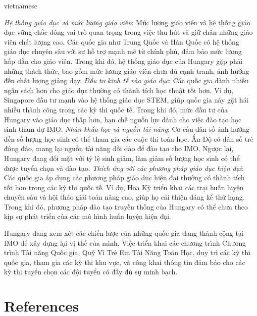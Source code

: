 \documentclass{article}
\begin{document}
\begin{otherlanguage*}{vietnamese}
\begin{itemize}[topsep=0pt, partopsep=0pt, itemsep=0pt]
    \ii \textit{Hệ thống giáo dục và mức lương giáo viên}: Mức lương giáo viên và hệ thống giáo dục vững chắc đóng vai trò quan trọng trong việc thu hút và giữ chân những giáo viên chất lượng cao.
    Các quốc gia như Trung Quốc và Hàn Quốc có hệ thống giáo dục chuyên sâu với sự hỗ trợ mạnh mẽ từ chính phủ, đảm bảo mức lương hấp dẫn cho giáo viên.
    Trong khi đó, hệ thống giáo dục của Hungary gặp phải những thách thức, bao gồm mức lương giáo viên chưa đủ cạnh tranh, ảnh hưởng đến chất lượng giảng dạy.
    \ii \textit{Đầu tư kinh tế vào giáo dục}: Các quốc gia dành nhiều ngân sách hơn cho giáo dục thường có thành tích học thuật tốt hơn.
    Ví dụ, Singapore đầu tư mạnh vào hệ thống giáo dục STEM, giúp quốc gia này gặt hái nhiều thành công trong các kỳ thi quốc tế.
    Trong khi đó, mức đầu tư của Hungary vào giáo dục thấp hơn, hạn chế nguồn lực dành cho việc đào tạo học sinh tham dự IMO.
    \ii \textit{Nhân khẩu học và nguồn tài năng}: Cơ cấu dân số ảnh hưởng đến số lượng học sinh có thể tham gia các cuộc thi toán học. Ấn Độ có dân số trẻ đông đảo, mang lại nguồn tài năng dồi dào để đào tạo cho IMO.
    Ngược lại, Hungary đang đối mặt với tỷ lệ sinh giảm, làm giảm số lượng học sinh có thể được tuyển chọn và đào tạo.
    \ii \textit{Thích ứng với các phương pháp giáo dục hiện đại}: Các quốc gia áp dụng các phương pháp giáo dục hiện đại thường có thành tích tốt hơn trong các kỳ thi quốc tế.
    Ví dụ, Hoa Kỳ triển khai các trại huấn luyện chuyên sâu và hội thảo giải toán nâng cao, giúp họ cải thiện đáng kể thứ hạng.
    Trong khi đó, phương pháp đào tạo truyền thống của Hungary có thể chưa theo kịp sự phát triển của các mô hình huấn luyện hiện đại.
\end{itemize}

Hungary đang xem xét các chiến lược của những quốc gia đang thành công tại IMO để xây dựng lại vị thế của mình.
Việc triển khai các chương trình Chương trình Tài năng Quốc gia, Quỹ Vì Trẻ Em Tài Năng Toán Học, duy trì các kỳ thi quốc gia, tham gia các kỳ thi khu vực,
và công khai thông tin đảm bảo cho các kỳ thi tuyển chọn các đội tuyển có đầy đủ sự minh bạch.

\newpage

\section*{References}

\begin{thebibliography}{99}


\end{thebibliography}
\end{otherlanguage*}
\end{document}
